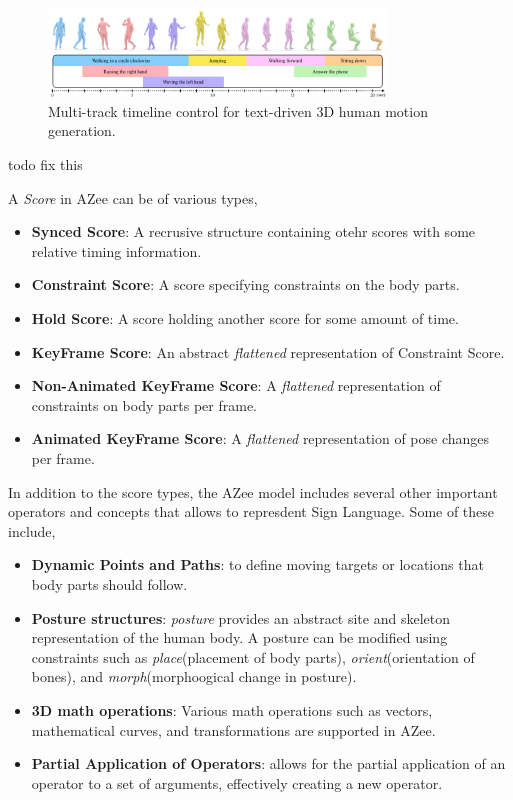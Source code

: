 \documentclass[../../main.tex]{subfiles}
\begin{document}
\begin{figure}
    \centering
    \includegraphics[width=0.8\textwidth]{chapters/multi_track/images/multi_track_other.png}
    \caption{Multi-track timeline control for text-driven 3D human motion generation.}
    \label{fig:multi_track_other}
\end{figure}

todo fix this

A \emph{Score} in AZee can be of various types,

\begin{itemize}
  \item \textbf{Synced Score}: A recrusive structure containing otehr scores with some relative timing information.
  \item \textbf{Constraint Score}: A score specifying constraints on the body parts.
  \item \textbf{Hold Score}: A score holding another score for some amount of time.
  \item \textbf{KeyFrame Score}: An abstract \emph{flattened} representation of Constraint Score.
  \item \textbf{Non-Animated KeyFrame Score}: A \emph{flattened} representation of constraints on body parts per frame.
  \item \textbf{Animated KeyFrame Score}: A \emph{flattened} representation of pose changes per frame.
\end{itemize}

In addition to the score types, the AZee model includes several other important operators and concepts that allows to represdent Sign Language. Some of these include,

\begin{itemize}
  \item \textbf{Dynamic Points and Paths}: to define moving targets or locations that body parts should follow.
  \item \textbf{Posture structures}: \emph{posture} provides an abstract site and skeleton representation of the human body. A posture can be modified using constraints such as \emph{place}(placement of body parts), \emph{orient}(orientation of bones), and \emph{morph}(morphoogical change in posture).
  \item \textbf{3D math operations}: Various math operations such as vectors, mathematical curves, and transformations are supported in AZee.
  \item \textbf{Partial Application of Operators}: allows for the partial application of an operator to a set of arguments, effectively creating a new operator.
\end{itemize}
\end{document}
